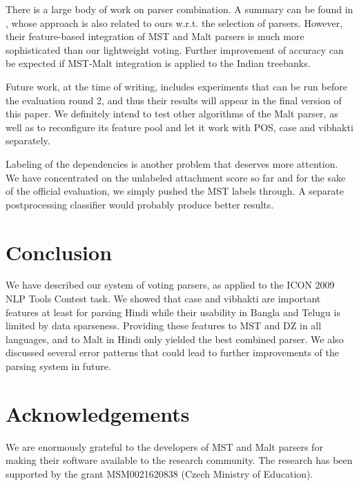 \documentclass[11pt]{article}
\begin{document}
There is a large body of work on parser combination. A summary can be found in \citet{nivre-mcdonald:2008:ACLMain}, whose approach is also related to ours w.r.t. the selection of parsers. However, their feature-based integration of MST and Malt parsers is much more sophisticated than our lightweight voting. Further improvement of accuracy can be expected if MST-Malt integration is applied to the Indian treebanks.

Future work, at the time of writing, includes experiments that can be run before the evaluation round 2, and thus their results will appear in the final version of this paper. We definitely intend to test other algorithms of the Malt parser, as well as to reconfigure its feature pool and let it work with POS, case and vibhakti separately.

Labeling of the dependencies is another problem that deserves more attention. We have concentrated on the unlabeled attachment score so far and for the sake of the official evaluation, we simply pushed the MST labels through. A separate postprocessing classifier would probably produce better results.

\section{Conclusion}
\label{sec:concl}

We have described our system of voting parsers, as applied to the ICON 2009 NLP Tools Contest task. We showed that case and vibhakti are important features at least for parsing Hindi while their usability in Bangla and Telugu is limited by data sparseness. Providing these features to MST and DZ in all languages, and to Malt in Hindi only yielded the best combined parser. We also discussed several error patterns that could lead to further improvements of the parsing system in future.

\section*{Acknowledgements}

We are enormously grateful to the developers of MST and Malt parsers for making their software available to the research community.
The research has been supported by the grant 
MSM0021620838 (Czech Ministry of Education).

\begin{small}

\end{small}
\end{document}
